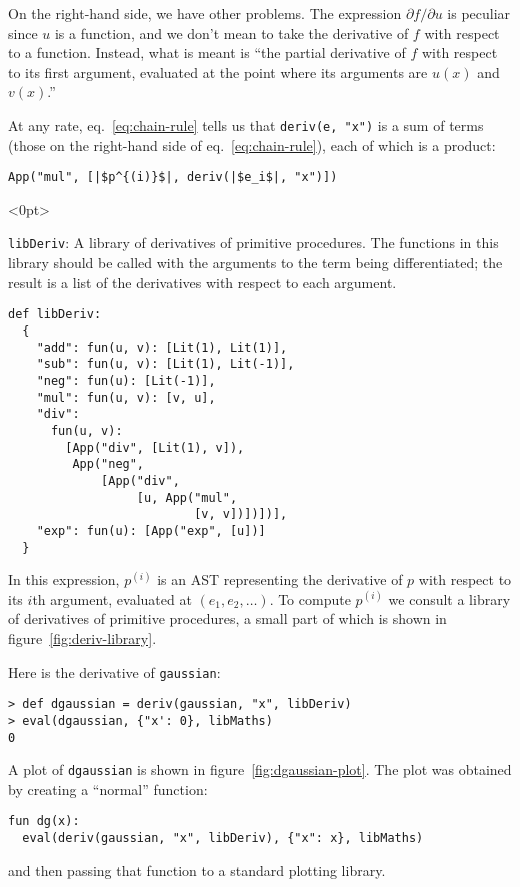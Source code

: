 \documentclass[11pt, a4paper]{article}
\newcommand{\cd}[1]{\texttt{#1}}
\begin{document}
On the right-hand side, we have other problems. The expression
$\partial f/\partial u$ is peculiar since $u$ is a function, and we don't mean to
take the derivative of $f$ with respect to a function. Instead, what
is meant is ``the partial derivative of $f$ with respect to its first
argument, evaluated at the point where its arguments are $u(x)$
and~$v(x)$.''

At any rate, eq.~\ref{eq:chain-rule} tells us that \cd{deriv(e, "x")}
is a sum of terms (those on the right-hand side of
eq.~\eqref{eq:chain-rule}), each of which is a product:
\begin{verbatim}
App("mul", [|$p^{(i)}$|, deriv(|$e_i$|, "x")])
\end{verbatim}

\begin{marginfigure}<0pt>
  \caption{\cd{libDeriv}: A library of derivatives of primitive
    procedures. The functions in this library should be called with
    the arguments to the term being differentiated; the result is a
    list of the derivatives with respect to each argument.\label{fig:deriv-library}}
  \footnotesize
\begin{verbatim}
def libDeriv:
  {
    "add": fun(u, v): [Lit(1), Lit(1)],
    "sub": fun(u, v): [Lit(1), Lit(-1)],
    "neg": fun(u): [Lit(-1)],
    "mul": fun(u, v): [v, u],
    "div": 
      fun(u, v):
        [App("div", [Lit(1), v]),
         App("neg",
             [App("div",
                  [u, App("mul",
                          [v, v])])])],
    "exp": fun(u): [App("exp", [u])]
  }
\end{verbatim}
\end{marginfigure}
In this expression, $p^{(i)}$ is an AST representing the derivative of
$p$ with respect to its $i$th argument, evaluated at
$(e_1, e_2, \dotsc)$. To compute $p^{(i)}$ we consult a library of
derivatives of primitive procedures, a small part of which is shown in
figure~\ref{fig:deriv-library}.

Here is the derivative of \cd{gaussian}:
\begin{verbatim}
> def dgaussian = deriv(gaussian, "x", libDeriv)
> eval(dgaussian, {"x': 0}, libMaths)
0
\end{verbatim}
A plot of \cd{dgaussian} is shown in figure~\ref{fig:dgaussian-plot}.
The plot was obtained by creating a ``normal'' function:
\begin{verbatim}
fun dg(x):
  eval(deriv(gaussian, "x", libDeriv), {"x": x}, libMaths)
\end{verbatim}
and then passing that function to a standard plotting library.
\end{document}
